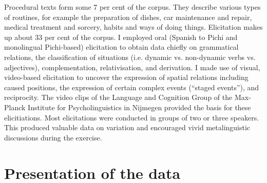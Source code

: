 Procedural texts form some 7 per cent of the corpus. They describe various types of routines, for example the preparation of dishes, car maintenance and repair, medical treatment and sorcery, habits and ways of doing things. Elicitation makes up about 33 per cent of the corpus. I employed oral (Spanish to Pichi and monolingual Pichi-based) elicitation to obtain data chiefly on grammatical relations, the classification of situations (i.e. dynamic vs. non-dynamic verbs vs. adjectives), complementation, relativisation, and derivation. I made use of visual, video-based elicitation to uncover the expression of spatial relations including caused positions, the expression of certain complex events (“staged events”), and reciprocity. The video clips of the Language and Cognition Group of the Max-Planck Institute for Psycholinguistics in Nijmegen provided the basis for these elicitiations. Most elicitations were conducted in groups of two or three speakers. This produced valuable data on variation and encouraged vivid metalinguistic discussions during the exercise. 

\section{Presentation of the data}\label{sec:1.8}
% 

